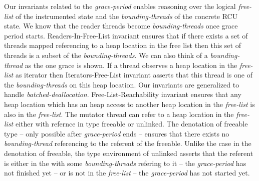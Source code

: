 Our invariants related to the \textit{grace-period} enables reasoning over the logical \textit{free-list} of the instrumented state and the \textit{bounding-threads} of the concrete RCU state. We know that the reader threads become \textit{bounding-threads} once grace period starts. \textsf{Readers-In-Free-List} invariant ensures that if there exists a set of threads mapped referencing to a heap location in the free list then this set of threads is a subset of the \textit{bounding-threads}. We can also think of a \textit{bounding-thread} as the one grace is shown. If a thread observes a heap location in the \textit{free-list} as \textsf{iterator} then \textsf{Iterators-Free-List} invariant asserts that this thread is one of the \textit{bounding-threads} on this heap location. Our invariants are generalized to handle \textit{batched-deallocation}. \textsf{Free-List-Reachability} invariant ensures that any heap location which has an heap access to another heap location in the \textit{free-list} is also in the \textit{free-list}. The mutator thread can refer to a heap location in the \textit{free-list} either with refernce in type \textsf{freeable} or \textsf{unlinked}. The denotation of \textsf{freeable} type -- only possible after \textit{grace-period} ends -- ensures that there exists no \textit{bounding-thread} referencing to the referent of the \textsf{freeable}. Unlike the case in the denotation of \textsf{freeable}, the type environment of \textsf{unlinked} asserts that the referent is either in the  with some \textit{bounding-threads} refering to it -- the \textit{grace-period} has not finished yet -- or is not in the \textit{free-list} --  the \textit{grace-period} has not started yet. 
